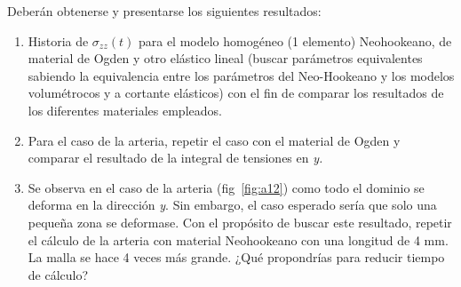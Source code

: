 Deberán obtenerse y presentarse los siguientes resultados:
\begin{enumerate}
	\item
	Historia de $\sigma_{zz}(t)$ para el modelo homogéneo (1 elemento) Neohookeano, de material de Ogden y otro elástico lineal (buscar parámetros equivalentes sabiendo la equivalencia entre los parámetros del Neo-Hookeano y los modelos volumétrocos y a cortante elásticos) con el fin de comparar los resultados de los diferentes materiales empleados.
	\item
	Para el caso de la arteria, repetir el caso con el material de Ogden y comparar el resultado de la integral de tensiones en \emph{y.} 
	\item
	Se observa en el caso de la arteria (fig~\ref{fig:a12}) como todo el dominio se deforma en la dirección \emph{y}. Sin embargo, el caso esperado sería que solo una pequeña zona se deformase. Con el propósito de buscar este resultado, repetir el cálculo de la arteria con material Neohookeano con una longitud de 4 mm. La malla se hace 4 veces más grande. ¿Qué propondrías para reducir tiempo de cálculo?
\end{enumerate}